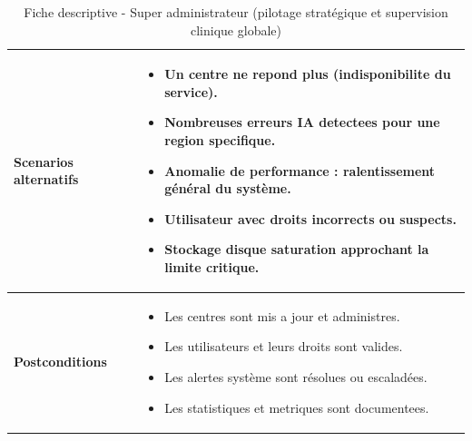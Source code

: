 \begin{table}[H]
\begin{tabular}{|p{5cm}|p{10cm}|}
\textbf{Scenarios alternatifs} &
\begin{itemize}
\item Un centre ne repond plus (indisponibilite du service).
\item Nombreuses erreurs IA detectees pour une region specifique.
\item Anomalie de performance : ralentissement général du système.
\item Utilisateur avec droits incorrects ou suspects.
\item Stockage disque saturation approchant la limite critique.
\end{itemize} \\ \hline

\textbf{Postconditions} &
\begin{itemize}
\item Les centres sont mis a jour et administres.
\item Les utilisateurs et leurs droits sont valides.
\item Les alertes système sont résolues ou escaladées.
\item Les statistiques et metriques sont documentees.
\end{itemize} \\ \hline
\end{tabular}
\caption{Fiche descriptive - Super administrateur (pilotage stratégique et supervision clinique globale)}
\end{table}


